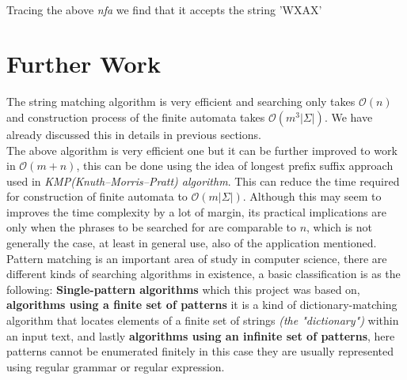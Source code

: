\documentclass[12pt,a4paper]{article}%
\begin{document}
\begin{flushleft}
\\
		\begin{center}
			Tracing the above \textit{nfa} we find that it accepts the string 'WXAX'
		\end{center}
	
    \end{flushleft}
	\pagebreak
	\section{Further Work}
	\begin{flushleft}
		\fontsize{12pt}{20pt}\selectfont
		The string matching algorithm is very efficient and searching only takes $\mathcal{O}(n)$ and construction process of the finite automata takes $\mathcal{O}(m^{3}|\Sigma|)$. We have already discussed this in details in previous sections.\\\bigskip
		The above algorithm is very efficient one but it can be further improved to work in  $\mathcal{O}(m+n)$, this can be done using the idea of longest prefix suffix approach used in \textit{KMP(Knuth–Morris–Pratt) algorithm}. This can reduce the time required for construction of finite automata to $\mathcal{O}(m|\Sigma|)$. Although this may seem to improves the time complexity by a lot of margin, its practical implications are only when the phrases to be searched for are comparable to $n$, which is not generally the case, at least in general use, also of the application mentioned.\\\bigskip
		Pattern matching is an important area of study in computer science, there are different kinds of searching algorithms in existence, a basic classification is as the following: \textbf{Single-pattern algorithms} which this project was based on, \textbf{algorithms using a finite set of patterns} it is a kind of dictionary-matching algorithm that locates elements of a finite set of strings \textit{(the "dictionary")} within an input text, and lastly \textbf{algorithms using an infinite set of patterns}, here patterns cannot be enumerated finitely in this case they are usually represented using regular grammar or regular expression.\\\bigskip
	\end{flushleft}
	\pagebreak
\end{document}
